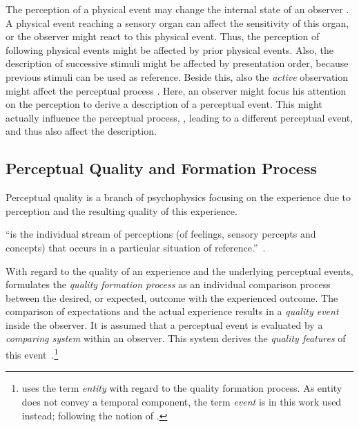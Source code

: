 The perception of a physical event may change the internal state of an observer \citep{raake_quality_2014}.
A physical event reaching a sensory organ can affect the sensitivity of this organ, or the observer might react to this physical event.
Thus, the perception of following physical events might be affected by prior physical events.
Also, the description of successive stimuli might be affected by presentation order, because previous stimuli can be used as reference.
Beside this, also the \emph{active} observation might affect the perceptual process \citep[][p.\,30]{raake_quality_2014}.
Here, an observer might focus his attention on the perception to derive a description of a perceptual event.
This might actually influence the perceptual process, \ie, leading to a different perceptual event, and thus also affect the description.


\subsection{Perceptual Quality and Formation Process}\label{related:perceivedQuality}
Perceptual quality is a branch of psychophysics focusing on the experience due to perception and the resulting quality of this experience.
\begin{definition}[Experiencing]
``is the individual stream of perceptions (of feelings, sensory percepts and concepts) that occurs in a particular situation of reference.''~\citep[p.\,13]{raake_quality_2014}.
\end{definition}

With regard to the quality of an experience and the underlying perceptual events, \citet{jekosch_voice_2005} formulates the \emph{quality formation process} as an individual comparison process between the desired, or expected, outcome with the experienced outcome.
The comparison of expectations and the actual experience results in a \emph{quality event} inside the observer.
It is assumed that a perceptual event is evaluated by a \emph{comparing system} within an observer.
This system  derives the \emph{quality features} of this event~\citep[\cf,][p.\,17]{jekosch_voice_2005}.\footnote{\citet{jekosch_voice_2005} uses the term \emph{entity} with regard to the quality formation process.
As entity does not convey a temporal component, the term \emph{event} is in this work used instead; following the notion of \citet{blauert_spatial_1996}.}

